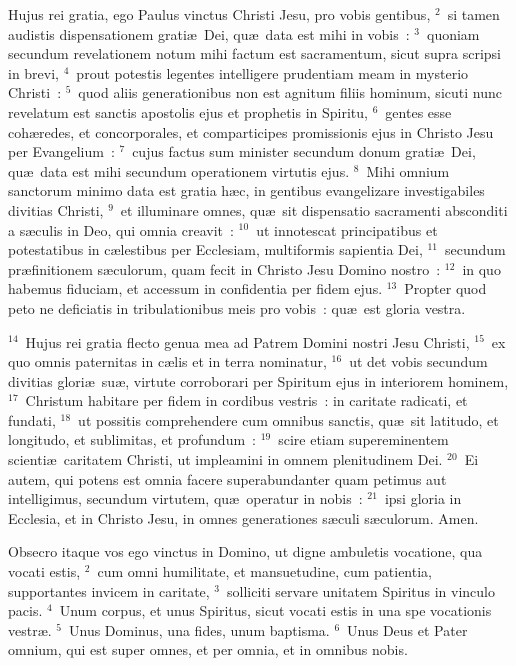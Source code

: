 \lettrine[lines=3,image=true,loversize=0.05,lraise=-0.03]{H}{}ujus rei gratia, ego Paulus vinctus Christi Jesu, pro vobis gentibus,
${}^{2}$~si tamen audistis dispensationem grati\ae\ Dei, qu\ae\ data est mihi in vobis~:
${}^{3}$~quoniam secundum revelationem notum mihi factum est sacramentum, sicut supra scripsi in brevi,
${}^{4}$~prout potestis legentes intelligere prudentiam meam in mysterio Christi~:
${}^{5}$~quod aliis generationibus non est agnitum filiis hominum, sicuti nunc revelatum est sanctis apostolis ejus et prophetis in Spiritu,
${}^{6}$~gentes esse coh\ae redes, et concorporales, et comparticipes promissionis ejus in Christo Jesu per Evangelium~:
${}^{7}$~cujus factus sum minister secundum donum grati\ae\ Dei, qu\ae\ data est mihi secundum operationem virtutis ejus.
${}^{8}$~Mihi omnium sanctorum minimo data est gratia h\ae c, in gentibus evangelizare investigabiles divitias Christi,
${}^{9}$~et illuminare omnes, qu\ae\ sit dispensatio sacramenti absconditi a s\ae culis in Deo, qui omnia creavit~:
${}^{10}$~ut innotescat principatibus et potestatibus in c\ae lestibus per Ecclesiam, multiformis sapientia Dei,
${}^{11}$~secundum pr\ae finitionem s\ae culorum, quam fecit in Christo Jesu Domino nostro~:
${}^{12}$~in quo habemus fiduciam, et accessum in confidentia per fidem ejus.
${}^{13}$~Propter quod peto ne deficiatis in tribulationibus meis pro vobis~: qu\ae\ est gloria vestra.


${}^{14}$~Hujus rei gratia flecto genua mea ad Patrem Domini nostri Jesu Christi,
${}^{15}$~ex quo omnis paternitas in c\ae lis et in terra nominatur,
${}^{16}$~ut det vobis secundum divitias glori\ae\ su\ae , virtute corroborari per Spiritum ejus in interiorem hominem,
${}^{17}$~Christum habitare per fidem in cordibus vestris~: in caritate radicati, et fundati,
${}^{18}$~ut possitis comprehendere cum omnibus sanctis, qu\ae\ sit latitudo, et longitudo, et sublimitas, et profundum~:
${}^{19}$~scire etiam supereminentem scienti\ae\ caritatem Christi, ut impleamini in omnem plenitudinem Dei.
${}^{20}$~Ei autem, qui potens est omnia facere superabundanter quam petimus aut intelligimus, secundum virtutem, qu\ae\ operatur in nobis~:
${}^{21}$~ipsi gloria in Ecclesia, et in Christo Jesu, in omnes generationes s\ae culi s\ae culorum. Amen.

\lettrine[lines=3,image=true,loversize=0.05,lraise=-0.03]{O}{}bsecro itaque vos ego vinctus in Domino, ut digne ambuletis vocatione, qua vocati estis,
${}^{2}$~cum omni humilitate, et mansuetudine, cum patientia, supportantes invicem in caritate,
${}^{3}$~solliciti servare unitatem Spiritus in vinculo pacis.
${}^{4}$~Unum corpus, et unus Spiritus, sicut vocati estis in una spe vocationis vestr\ae .
${}^{5}$~Unus Dominus, una fides, unum baptisma.
${}^{6}$~Unus Deus et Pater omnium, qui est super omnes, et per omnia, et in omnibus nobis.


